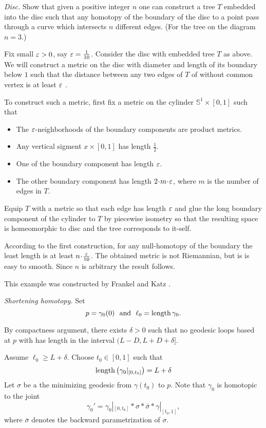 \textit{Disc.}
Show that given a positive integer $n$ one can construct a tree $T$ embedded into the disc such that any homotopy of the boundary of the disc to a point pass through a curve which intersects $n$ different edges.
(For the tree on the diagram $n=3$.)


Fix small $\varepsilon>0$, say $\varepsilon=\tfrac1{10}$.
Consider the disc with embedded tree $T$ as above.
We will construct a metric on the disc 
with diameter and length of its boundary below $1$
such that 
the distance between any two edges of $T$ of without common vertex 
is at least $\varepsilon$ .

To construct such a metric, first fix a metric on the cylinder $\mathbb S^1\times [0,1]$ such that 
\begin{itemize}
\item The $\varepsilon$-neighborhoods of the boundary components are product metrics.
\item Any vertical sigment $x\times[0,1]$ has length $\tfrac 12$.
\item One of the boundary component has length $\varepsilon$.
\item The other boundary component has length $2\cdot m\cdot \eps$, 
where $m$ is the number of edges in $T$.
\end{itemize}
Equip $T$ with a metric so that each edge has length $\varepsilon$
and glue the long boundary component of the cylinder to $T$ by piecewise isometry so that the resulting space is homeomorphic to disc and the tree corresponds to it-self.

According to the first construction,
for any null-homotopy of the boundary 
the least length is at least $n\cdot\tfrac{\eps}{10}$.
The obtained metric is not Riemannian, but is is easy to smooth.
Since $n$ is arbitrary the result follows.

This example was constructed by Frankel and Katz \cite{frankel-katz}.
 

\textit{Shortening homotopy.}
Set 
\[p=\gamma_0(0)\ \ \text{and}\ \  \ell_0=\length\gamma_0.\]

By compactness argument,
there exists $\delta>0$ 
such that no geodesic loops based at $p$ with has length in the interval $(L-D, L+D+\delta]$. 

Assume $\ell_0\ge L+\delta$.
Choose $t_0\in [0,1]$ such that
\[\operatorname{\rm length}\left(\gamma_0|_{[0,t_0]}\right)=L+\delta\]
Let $\sigma$ be a the minimizing geodesic from $\gamma(t_0)$
to $p$.
Note that $\gamma_0$ is homotopic to the joint 
\[\gamma_0'=\gamma_0|_{[0,t_0]}*\sigma*\bar\sigma*\gamma|_{[t_0,1]},\]
where $\bar\sigma$ denotes the backward parametrization of $\sigma$.

